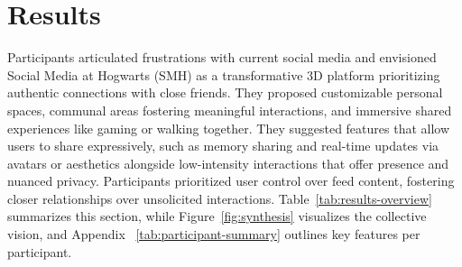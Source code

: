 \section{Results}
Participants articulated frustrations with current social media and envisioned Social Media at Hogwarts (SMH) as a transformative 3D platform prioritizing authentic connections with close friends.
They proposed customizable personal spaces, communal areas fostering meaningful interactions, and immersive shared experiences like gaming or walking together.
They suggested features that allow users to share expressively, such as memory sharing and real-time updates via avatars or aesthetics alongside low-intensity interactions that offer presence and nuanced privacy. Participants prioritized user control over feed content, fostering closer relationships over unsolicited interactions. Table~\ref{tab:results-overview} summarizes this section, while Figure~\ref{fig:synthesis} visualizes the collective vision, and Appendix ~\ref{tab:participant-summary} outlines key features per participant.%










